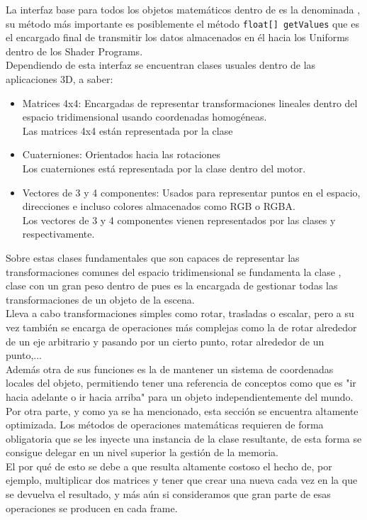 La interfaz base para todos los objetos matemáticos dentro de \robotto es la denominada \roreflinearalgebra, su método más importante es posiblemente el método \texttt{float[] getValues} que es el encargado final de transmitir los datos almacenados en él hacia los Uniforms dentro de los Shader Programs.\\

Dependiendo de esta interfaz se encuentran clases usuales dentro de las aplicaciones 3D, a saber:

\begin{itemize}
\item Matrices 4x4: Encargadas de representar transformaciones lineales dentro del espacio tridimensional usando coordenadas homogéneas.\\
Las matrices 4x4 están representada por la clase \rorefmatrix
\item Cuaterniones: Orientados hacia las rotaciones\\
Los cuaterniones está representada por la clase \rorefquaternion dentro del motor.
\item Vectores de 3 y 4 componentes: Usados para representar puntos en el espacio, direcciones e incluso colores almacenados como RGB o RGBA.\\
Los vectores de 3 y 4 componentes vienen representados por las clases \rorefvectortresf y \rorefvectorcuatrof respectivamente.
\end{itemize}

Sobre estas clases fundamentales que son capaces de representar las transformaciones comunes del espacio tridimensional se fundamenta la clase \roreftransform, clase con un gran peso dentro de \robotto pues es la encargada de gestionar todas las transformaciones de un objeto de la escena.\\
Lleva a cabo transformaciones simples como rotar, trasladas o escalar, pero a su vez también se encarga de operaciones más complejas como la de rotar alrededor de un eje arbitrario y pasando por un cierto punto, rotar alrededor de un punto,...\\
Además otra de sus funciones es la de mantener un sistema de coordenadas locales del objeto, permitiendo tener una referencia de conceptos como que es "ir hacia adelante o ir hacia arriba" para un objeto independientemente del mundo.\\

Por otra parte, y como ya se ha mencionado, esta sección se encuentra altamente optimizada. Los métodos de operaciones matemáticas requieren de forma obligatoria que se les inyecte una instancia de la clase resultante, de esta forma se consigue delegar en un nivel superior la gestión de la memoria.\\
El por qué de esto se debe a que resulta altamente costoso el hecho de, por ejemplo, multiplicar dos matrices y tener que crear una nueva cada vez en la que se devuelva el resultado, y más aún si consideramos que gran parte de esas operaciones se producen en cada frame.